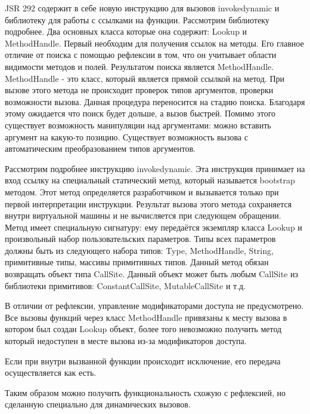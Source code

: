 JSR 292 содержит в себе новую инструкцию для вызовов invokedynamic и библиотеку для работы с ссылками на функции. Рассмотрим библиотеку подробнее. Два основных класса которые она содержит: Lookup и MethodHandle. Первый необходим для получения ссылок на методы. Его главное отличие от поиска с помощью рефлексии в том, что он учитывает области видимости методов и полей. Результатом поиска является MethodHandle. MethodHandle - это класс, который является прямой ссылкой на метод. При вызове этого метода не происходит проверок типов аргументов, проверки возможности вызова. Данная процедура переносится на стадию поиска. Благодаря этому ожидается что поиск будет дольше, а вызов быстрей. Помимо этого существует возможность манипуляции над аргументами: можно вставить аргумент на какую-то позицию. Существует возможность вызова с автоматическим преобразованием типов аргументов.

Рассмотрим подробнее инструкцию invokedynamic. Эта инструкция принимает на вход ссылку на специальный статический метод, который называется bootstrap методом. Этот метод определяется разработчиком и вызывается только при первой интерпретации инструкции. Результат вызова этого метода сохраняется внутри виртуальной машины и не вычисляется при следующем обращении. Метод имеет специальную сигнатуру: ему передаётся экземпляр класса Lookup и произвольный набор пользовательских параметров. Типы всех параметров должны быть из следующего набора типов: Type, MethodHandle, String, примитивные типы, массивы примитивных типов. Данный метод обязан возвращать объект типа CallSite. Данный объект может быть любым CallSite из библиотеки примитивов: ConstantCallSite, MutableCallSite и т.д.

В отличии от рефлексии, управление модификаторами доступа не предусмотрено. Все вызовы функций через класс MethodHandle привязаны к месту вызова в котором был создан Lookup объект, более того невозможно получить метод который недоступен в месте вызова из-за модификаторов доступа.

Если при внутри вызванной функции происходит исключение, его передача осуществляется как есть.

Таким образом можно получить функциональность схожую с рефлексией, но сделанную специально для динамических вызовов.
